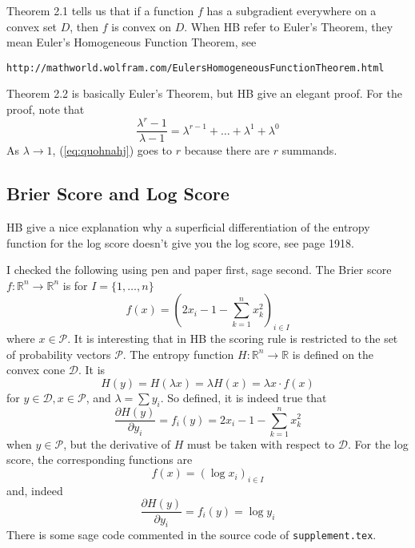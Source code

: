 \documentclass[12pt]{article}
\begin{document}
Theorem 2.1 tells us that if a function $f$ has a subgradient
everywhere on a convex set $D$, then $f$ is convex on $D$. When HB
refer to Euler's Theorem, they mean Euler's Homogeneous Function
Theorem, see
\begin{alltt}
http://mathworld.wolfram.com/EulersHomogeneousFunctionTheorem.html
\end{alltt}

Theorem 2.2 is basically Euler's Theorem, but HB give an elegant
proof. For the proof, note that
\begin{equation}
  \label{eq:quohnahj}
  \frac{\lambda^{r}-1}{\lambda-1}=\lambda^{r-1}+{\ldots}+\lambda^{1}+\lambda^{0}
\end{equation}
As $\lambda\rightarrow{}1$, (\ref{eq:quohnahj}) goes to $r$ because
there are $r$ summands.

\subsection{Brier Score and Log Score}
\label{subsection:eesheing}

HB give a nice explanation why a superficial differentiation of
the entropy function for the log score doesn't give you the log
score, see page 1918.

I checked the following using pen and paper first, sage second.
The Brier score $f:\mathbb{R}^{n}\rightarrow\mathbb{R}^{n}$ is for
$I=\{1,{\ldots},n\}$
\begin{equation}
  \label{eq:xeezaise}
  f(x)=\left(2x_{i}-1-\sum_{k=1}^{n}x_{k}^{2}\right)_{i\in{}I}
\end{equation}
where $x\in\mathcal{P}$. It is interesting that in HB the scoring
rule is restricted to the set of probability vectors
$\mathcal{P}$. The entropy function
$H:\mathbb{R}^{n}\rightarrow\mathbb{R}$ is defined on the convex
cone $\mathcal{D}$. It is
\begin{equation}
  \label{eq:aejujuez}
  H(y)=H(\lambda{}x)=\lambda{}H(x)=\lambda{}x\cdot{}f(x)
\end{equation}
for $y\in\mathcal{D},x\in\mathcal{P}$, and
$\lambda=\sum{}y_{i}$. So defined, it is indeed true
that
\begin{equation}
  \label{eq:ieghaico}
  \frac{\partial{}H(y)}{\partial{}y_{i}}=f_{i}(y)=2x_{i}-1-\sum_{k=1}^{n}x_{k}^{2}
\end{equation}
when $y\in\mathcal{P}$, but the derivative of $H$ must be taken with
respect to $\mathcal{D}$. For the log score, the corresponding
functions are
\begin{equation}
  \label{eq:noofitho}
  f(x)=\left(\log{}x_{i}\right)_{i\in{}I}
\end{equation}
and, indeed
\begin{equation}
  \label{eq:oofoothi}
  \frac{\partial{}H(y)}{\partial{}y_{i}}=f_{i}(y)=\log{}y_{i}
\end{equation}
There is some sage code commented in the source code of \texttt{supplement.tex}.
\end{document}
